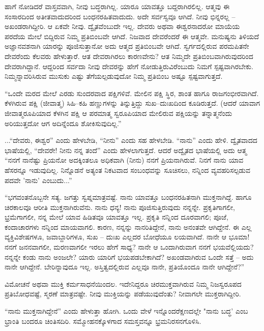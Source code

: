 ಹಾಗೆ ನೋಡಿದರೆ ವಾಸ್ತವವಾಗಿ, ನೀವು ಬದ್ಧರಾಗಿಲ್ಲ. ಯಾರೂ ಯಾವತ್ತೂ ಬದ್ದರಾಗಿರಲಿಲ್ಲ. ಆತ್ಮವು ಈ ಸಂಸಾರದಿಂದ ಅತೀತವಾದುದರಿಂದ ಬಂಧನರಹಿತವಾದುದು. ಅದೇ ಸರ್ವಸ್ವವೂ ಆಗಿದೆ. ನೀವು ಭಿನ್ನರಲ್ಲ – ಅಖಂಡರಾಗಿದ್ದೀರಿ. ಆ ಏಕವೇ ನೀವು. ದ್ವೈತವೆಂಬುದೇ ಇಲ್ಲ. ದೇವರು ಅಥವಾ ಈಶ್ವರನಾದರೋ ಮಾಯೆಯ ಪರದೆಯ ಮೇಲೆ ಬಿದ್ದಿರುವ ನಿಮ್ಮ ಪ್ರತಿಬಿಂಬವೇ ಆಗಿದೆ. ನಿಜವಾದ ದೇವರೆಂದರೆ ಈ ಆತ್ಮವೇ. ಮನುಷ್ಯನು ತಿಳಿಯದೆ ಅಜ್ಞಾನವಶನಾಗಿ ಯಾರನ್ನು ಪೂಜಿಸುತ್ತಾನೋ ಅದು ಆತ್ಮದ ಪ್ರತಿಬಿಂಬವೇ ಆಗಿದೆ. ಸ್ವರ್ಗದಲ್ಲಿರುವ ಪರಮಪಿತನೇ ದೇವರೆಂದು ಕೆಲವರು ಹೇಳುತ್ತಾರೆ. ಆತ ದೇವರಾಗಿರಲು ಕಾರಣವೇನು? ಆತ ನಿಮ್ಮದೇ ಪ್ರತಿಬಿಂಬವಾಗಿರುವುದರಿಂದ ದೇವರಾಗಿದ್ದಾನೆ. ಆದ್ದರಿಂದ ಸರ್ವದಾ ನೀವು ದೇವರನ್ನು ಹೇಗೆ ನೋಡುತ್ತಿರುವಿರೆಂಬುದು ನಿಮಗೆ ಸ್ಪಷ್ಟವಾಗಿರಬೇಕು. ನಿಮ್ಮನ್ನಾವರಿಸಿರುವ ಮುಸುಕು ಎಷ್ಟು ತೆಗೆಯಲ್ಪಡುವುದೋ ನಿಮ್ಮ ಪ್ರತಿಬಿಂಬ ಅಷ್ಟೂ ಸ್ಪಷ್ಟವಾಗುತ್ತದೆ.

“ಒಂದೇ ಮರದ ಮೇಲೆ ಎರಡು ಸುಂದರವಾದ ಪಕ್ಷಿಗಳಿವೆ. ಮೇಲಿನ ಪಕ್ಷಿ ಸ್ಥಿರ, ಶಾಂತ ಹಾಗೂ ರಾಜಗಂಭೀರವಾಗಿದೆ. ಕೆಳಗಿರುವ ಪಕ್ಷಿ (ಜೀವಾತ್ಮ) ಸಿಹಿ–ಕಹಿ ಹಣ್ಣುಗಳನ್ನು ತಿನ್ನುತ್ತಿದ್ದು ಸುಖ–ದುಃಖದಿಂದ ಕೂಡಿರುತ್ತದೆ. (ಆದರೆ ಯಾವಾಗ ಜೀವಾತ್ಮರೂಪಿಯಾದ ಕೆಳಗಿನ ಪಕ್ಷಿ ಆ ಪರಮಾತ್ಮ ಸ್ವರೂಪಿಯಾದ ಮೇಲಿರುವ ಪಕ್ಷಿಯನ್ನು ತನ್ನಾತ್ಮನೆಂದು ಅರಿಯುತ್ತದೋ ಆಗ ಅದಿನ್ನೆಂದೂ ಶೋಕಿಸುವುದಿಲ್ಲ.”

...“ದೇವರು, ಈಶ್ವರ” ಎಂದು ಹೇಳಬೇಡಿ, “ನೀನು'' ಎಂದು ಸಹ ಹೇಳಬೇಡಿ. “ನಾನು” ಎಂದು ಹೇಳಿ. ದ್ವೈತವಾದದ ಭಾಷೆಯಲ್ಲಿ, “ದೇವರೇ! ನೀನು ನನ್ನ ತಂದೆ” ಎಂದು ಹೇಳಲಾಗುತ್ತದೆ. ಆದರೆ ಅದ್ವೈತದ ಭಾಷೆಯಲ್ಲಿ ಅದು ಆತ್ಮ “ನನಗೆ ನಾನೆಷ್ಟು ಪ್ರಿಯನೋ ಅದಕ್ಕಿಂತಲೂ ಅಧಿಕವಾಗಿ (ನೀನು) ನನಗೆ ಪ್ರಿಯನಾಗಿರುವೆ. ನಿನಗೆ ನಾನು ಯಾವ ಹೆಸರನ್ನೂ ಇಡುವುದಿಲ್ಲ. ನಿನ್ನೊಡನೆ ಅತ್ಯಂತ ನಿಕಟವಾದ ಸಂಬಂಧವನ್ನು ಸೂಚಿಸಲು, ನನ್ನಿಂದ ವ್ಯವಹರಿಸಲ್ಪಡುವ ಪದವೇ 'ನಾನು' ಎಂಬುದು...”

“ಭಗವಂತನೊಬ್ಬನೇ ಸತ್ಯ. ಜಗತ್ತು ಸ್ವಪ್ನಮಾತ್ರವಷ್ಟೆ. ನಾನು ಯಾವತ್ತೂ ಬಂಧನರಹಿತನಾಗಿ ಮುಕ್ತನಾಗಿದ್ದೆ. ಹಾಗೂ ಚಿರಕಾಲವೂ ಆರೀತಿ ಮುಕ್ತನಾಗಿರುವೆನು. ನಾನು ಧನ್ಯ! ನಾನು ಪೂಜಿಸುತ್ತಿರುವುದು ನನ್ನನ್ನೇ. ಪ್ರಕೃತಿಗಾಗಲೀ, ಭ್ರಮೆಗಾಗಲೀ, ನನ್ನ ಮೇಲೆ ಯಾವ ಹಿಡಿತವೂ ಯಾವತ್ತೂ ಇಲ್ಲ. ಪ್ರಕೃತಿ ನನ್ನಿಂದ ದೂರವಾಗಲಿ; ಪೂಜೆ, ಕಂದಾಚಾರಗಳು ನನ್ನಿಂದ ಮಾಯವಾಗಲಿ. ಕಾರಣ, ನನ್ನನ್ನು ನಾನರಿತಿದ್ದೇನೆ, ನಾನು ಅನಂತವೇ ಆಗಿದ್ದೇನೆ. ಈ ಎಲ್ಲ ವ್ಯಕ್ತಿವಿಶೇಷಗಳೂ, ಜವಾಬ್ದಾರಿಗಳೂ, ಸುಖ – ದುಃಖ ಎಲ್ಲದರ ಬೋಧೆಯೂ ಲಯವಾಗಿದೆ. ನಾನೇ ಆ ಭೂಮಾ! ನನಗೆ ಜನನವಾಗಲೀ, ಮರಣವಾಗಲೀ ಇರಲು ಹೇಗೆ ಸಾಧ್ಯ? ನಾನೇ ಆ ಒಂದಾಗಿರುವಾಗ ನನಗೆ ಭಯವೆಲ್ಲಿಯದು? ನನ್ನನ್ನೇ ಕಂಡು ನಾನು ಅಂಜಲೇ? ಯಾರು ಯಾರಿಗೆ ಭಯಪಡಬೇಕಾಗಿದೆ? ಅಖಂಡವಾಗಿರುವ ಒಂದೇ ಸತ್ತೆ – ಅದು ನಾನೇ ಆಗಿದ್ದೇನೆ. ಬೇರಿನ್ನಾವುದೂ ಇಲ್ಲ. ಅಸ್ತಿತ್ವದಲ್ಲಿರುವ ಎಲ್ಲವೂ ನಾನೇ, ಪ್ರತಿಯೊಂದೂ ನಾನೇ ಆಗಿದ್ದೇನೆ?”

ವಿಮೋಚನೆ ಅಥವಾ ಮುಕ್ತಿ ಕರ್ಮಸಾಧನೆಯಿಂದಲ. ಇದೇನಿದ್ದರೂ ಚಿರಮುಕ್ತವಾಗಿರುವ ನಿಮ್ಮ ನಿಜಸ್ವರೂಪದ ಪ್ರತಿಬೋಧವಷ್ಟೆ, ಸ್ಮರಣೆ ಮಾತ್ರವಷ್ಟೇ. ನೀವು ಮುಕ್ತಿಯನ್ನು ಪಡೆಯುವುದೆಂತು? ನೀವಾಗಲೇ ಮುಕ್ತರಾಗಿದ್ದೀರಿ.

“ನಾನು ಮುಕ್ತನಾಗಿದ್ದೇನೆ” ಎಂದು ಹೇಳುತ್ತಾ ಹೋಗಿ. ಒಂದು ವೇಳೆ ಇನ್ನೊಂದರೆಕ್ಷಣದಲ್ಲೇ "ನಾನು ಬದ್ಧ' ಎಂಬ ಭ್ರಾಂತಿ ಬಂದರೂ ಚಿಂತಿಸದಿರಿ. ಸಮ್ಮೋಹನಕ್ಕೊಳಗಾದ ಸಮಸ್ತವನ್ನೂ ಭ್ರಮನಿರಸನಗೊಳಿಸಿ.

